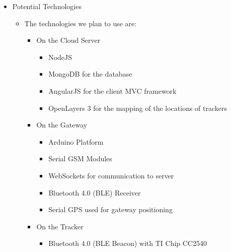 \begin{itemize}
	\item Potential Technologies
	\begin{itemize}
		\item[] The technologies we plan to use are:
		\begin{itemize}
			\item On the Cloud Server
			\begin{itemize}
				\item NodeJS
				\item MongoDB for the database
				\item AngularJS for the client MVC framework
				\item OpenLayers 3 for the mapping of the locations of trackers
			\end{itemize}
			\item On the Gateway
			\begin{itemize}
				\item Arduino Platform
				\item Serial GSM Modules
				\item WebSockets for communication to server
				\item Bluetooth 4.0 (BLE) Receiver
				\item Serial GPS used for gateway positioning
			\end{itemize}
			\item On the Tracker
			\begin{itemize}
				\item Bluetooth 4.0 (BLE Beacon) with TI Chip CC2540
			\end{itemize}
		\end{itemize}
	\end{itemize}
	

\end{itemize}
